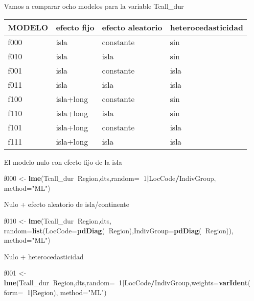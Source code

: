 \documentclass[]{article}
\newenvironment{Shaded}{\begin{snugshade}}{\end{snugshade}}
\newcommand{\DataTypeTok}[1]{\textcolor[rgb]{0.13,0.29,0.53}{#1}}
\newcommand{\DecValTok}[1]{\textcolor[rgb]{0.00,0.00,0.81}{#1}}
\newcommand{\KeywordTok}[1]{\textcolor[rgb]{0.13,0.29,0.53}{\textbf{#1}}}
\newcommand{\NormalTok}[1]{#1}
\newcommand{\OperatorTok}[1]{\textcolor[rgb]{0.81,0.36,0.00}{\textbf{#1}}}
\newcommand{\StringTok}[1]{\textcolor[rgb]{0.31,0.60,0.02}{#1}}
\begin{document}
Vamos a comparar ocho modelos para la variable Tcall\_dur

\begin{longtable}[]{@{}llll@{}}
\toprule
MODELO & efecto fijo & efecto aleatorio &
heterocedasticidad\tabularnewline
\midrule
\endhead
f000 & isla & constante & sin\tabularnewline
f010 & isla & isla & sin\tabularnewline
f001 & isla & constante & isla\tabularnewline
f011 & isla & isla & isla\tabularnewline
f100 & isla+long & constante & sin\tabularnewline
f110 & isla+long & isla & sin\tabularnewline
f101 & isla+long & constante & isla\tabularnewline
f111 & isla+long & isla & isla\tabularnewline
\bottomrule
\end{longtable}

El modelo nulo con efecto fijo de la isla

\begin{Shaded}
\begin{Highlighting}[]
\NormalTok{f000 <-}\StringTok{ }\KeywordTok{lme}\NormalTok{(Tcall_dur}\OperatorTok{~}\NormalTok{Region,dts,}\DataTypeTok{random=}\OperatorTok{~}\DecValTok{1}\OperatorTok{|}\NormalTok{LocCode}\OperatorTok{/}\NormalTok{IndivGroup, }\DataTypeTok{method=}\StringTok{"ML"}\NormalTok{)}
\end{Highlighting}
\end{Shaded}

Nulo + efecto aleatorio de isla/continente

\begin{Shaded}
\begin{Highlighting}[]
\NormalTok{f010 <-}\StringTok{ }\KeywordTok{lme}\NormalTok{(Tcall_dur}\OperatorTok{~}\NormalTok{Region,dts,}
  \DataTypeTok{random=}\KeywordTok{list}\NormalTok{(}\DataTypeTok{LocCode=}\KeywordTok{pdDiag}\NormalTok{(}\OperatorTok{~}\NormalTok{Region),}\DataTypeTok{IndivGroup=}\KeywordTok{pdDiag}\NormalTok{(}\OperatorTok{~}\NormalTok{Region)), }\DataTypeTok{method=}\StringTok{"ML"}\NormalTok{)}
\end{Highlighting}
\end{Shaded}

Nulo + heterocedasticidad

\begin{Shaded}
\begin{Highlighting}[]
\NormalTok{f001 <-}\StringTok{ }\KeywordTok{lme}\NormalTok{(Tcall_dur}\OperatorTok{~}\NormalTok{Region,dts,}\DataTypeTok{random=}\OperatorTok{~}\DecValTok{1}\OperatorTok{|}\NormalTok{LocCode}\OperatorTok{/}\NormalTok{IndivGroup,}\DataTypeTok{weights=}\KeywordTok{varIdent}\NormalTok{(}\DataTypeTok{form=}\OperatorTok{~}\DecValTok{1}\OperatorTok{|}\NormalTok{Region), }\DataTypeTok{method=}\StringTok{"ML"}\NormalTok{)}
\end{Highlighting}
\end{Shaded}
\end{document}
